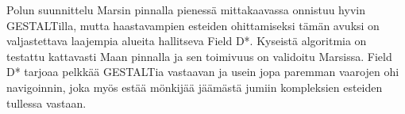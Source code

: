 \documentclass[finnish]{tktltiki2}
\theoremstyle{definition}
\theoremstyle{remark}
\begin{document}
Polun suunnittelu Marsin pinnalla pienessä mittakaavassa onnistuu hyvin GESTALTilla, mutta haastavampien esteiden ohittamiseksi tämän avuksi on valjastettava laajempia alueita hallitseva Field D*. Kyseistä algoritmia on testattu kattavasti Maan pinnalla ja sen toimivuus on validoitu Marsissa. Field D* tarjoaa pelkkää GESTALTia vastaavan ja usein jopa paremman vaarojen ohi navigoinnin, joka myös estää mönkijää jäämästä jumiin kompleksien esteiden tullessa vastaan.\cite{marsjuttuja}


%
%
% 
%







% 
\end{document}
